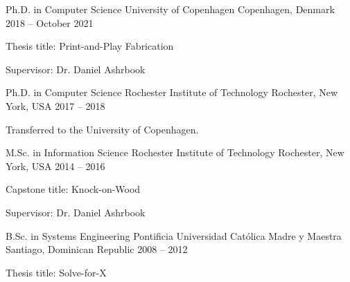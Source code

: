 
\begin{cventries}

  \cventry
    {Ph.D. in Computer Science}
    {University of Copenhagen}
    {Copenhagen, Denmark}
    {2018 -- October 2021}
    {
      \begin{cvitems}
        \item{Thesis title: Print-and-Play Fabrication}
        \item{Supervisor: Dr. Daniel Ashrbook}
      \end{cvitems}
      \vspace{1em}
    }

  \cventry
    {Ph.D. in Computer Science}
    {Rochester Institute of Technology}
    {Rochester, New York, USA}
    {2017 -- 2018}
    {
      \begin{cvitems}
        \item Transferred to the University of Copenhagen.
      \end{cvitems}
    }

  \cventry
    {M.Sc. in Information Science}
    {Rochester Institute of Technology}
    {Rochester, New York, USA}
    {2014 -- 2016}
    {
      \begin{cvitems}
        \item{Capstone title: Knock-on-Wood}
        \item{Supervisor: Dr. Daniel Ashrbook}
      \end{cvitems}
      \vspace{1em}
    }

  \cventry
    {B.Sc. in Systems Engineering}
    {Pontificia Universidad Cat\'olica Madre y Maestra}
    {Santiago, Dominican Republic}
    {2008 -- 2012}
    {
      \begin{cvitems}
        \item{Thesis title: Solve-for-X}
      \end{cvitems}
    }

\end{cventries}
